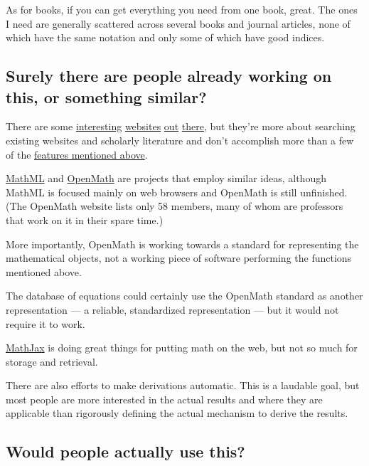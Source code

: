 \documentclass[12pt,letterpaper]{article}
\begin{document}

As for books, if you can get everything you need from one book, great. The ones I need are generally scattered across several books and journal articles, none of which have the same notation and only some of which have good indices.

\subsection{Surely there are people already working on this, or something similar?}

There are some
\href{http://symbolab.com/}{interesting} \href{http://latexsearch.com/}{websites} \href{http://www.dessci.com/en/reference/searching/math-searching.htm}{out}
\href{http://www.equationsheet.com/}{there},
but they're more about searching existing websites and scholarly literature and don't accomplish more than a few of the \hyperref[features]{features mentioned above}.

\href{http://www.w3.org/Math/}{MathML} and \href{http://www.openmath.org/}{OpenMath} are projects that employ similar ideas, although MathML is focused mainly on web browsers and OpenMath is still unfinished. (The OpenMath website lists only 58 members, many of whom are professors that work on it in their spare time.)

More importantly, OpenMath is working towards a standard for representing the mathematical objects, not a working piece of software performing the functions mentioned above.

The database of equations could certainly use the OpenMath standard as another representation --- a reliable, standardized representation --- but it would not require it to work.

\href{http://www.mathjax.org/}{MathJax} is doing great things for putting math on the web, but not so much for storage and retrieval.

There are also efforts to make derivations automatic. This is a laudable goal, but most people are more interested in the actual results and where they are applicable than rigorously defining the actual mechanism to derive the results.

\subsection{Would people actually use this?}
\end{document}
